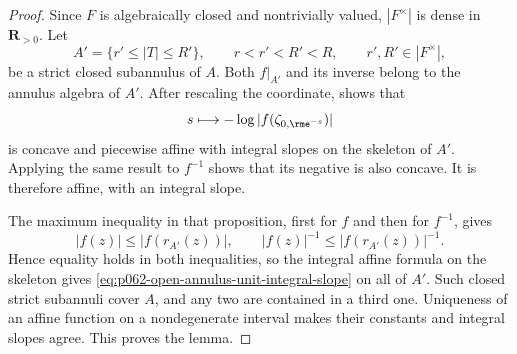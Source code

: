 \begin{proof}
Since $F$ is algebraically closed and nontrivially valued, $|F^\times|$ is
dense in $\mathbf R_{>0}$.  Let
\[
 A' = \{r'\leq|T|\leq R'\},
 \qquad r<r'<R'<R,
 \qquad r',R'\in|F^\times|,
\]
be a strict closed subannulus of $A$.  Both $f|_{A'}$ and its inverse belong
to the annulus algebra of $A'$.  After rescaling the coordinate,
 shows that
\[
 s\longmapsto-\log|f(\zeta_{0,\rme^{-s}})|
\]
is concave and piecewise affine with integral slopes on the skeleton of
$A'$.  Applying the same result to $f^{-1}$ shows that its negative is also
concave.  It is therefore affine, with an integral slope.

The maximum inequality in that proposition, first for $f$ and then for
$f^{-1}$, gives
\[
 |f(z)|\leq|f(r_{A'}(z))|,
 \qquad
 |f(z)|^{-1}\leq|f(r_{A'}(z))|^{-1}.
\]
Hence equality holds in both inequalities, so the integral affine formula
on the skeleton gives
\eqref{eq:p062-open-annulus-unit-integral-slope} on all of $A'$.  Such
closed strict subannuli cover $A$, and any two are contained in a third one.
Uniqueness of an affine function on a nondegenerate interval makes their
constants and integral slopes agree.  This proves the lemma.
\end{proof}

